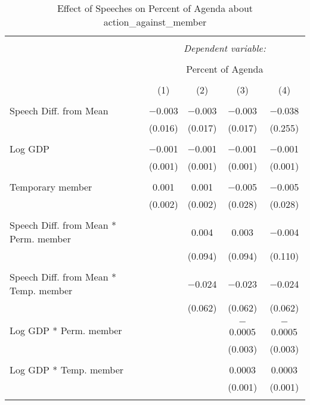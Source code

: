 
\begin{table}[!htbp] \centering 
  \caption{Effect of Speeches on Percent of Agenda about action_against_member} 
  \label{} 
\begin{tabular}{@{\extracolsep{5pt}}lcccc} 
\\[-1.8ex]\hline 
\hline \\[-1.8ex] 
 & \multicolumn{4}{c}{\textit{Dependent variable:}} \\ 
\cline{2-5} 
\\[-1.8ex] & \multicolumn{4}{c}{Percent of Agenda} \\ 
\\[-1.8ex] & (1) & (2) & (3) & (4)\\ 
\hline \\[-1.8ex] 
 Speech Diff. from Mean & $-$0.003 & $-$0.003 & $-$0.003 & $-$0.038 \\ 
  & (0.016) & (0.017) & (0.017) & (0.255) \\ 
  & & & & \\ 
 Log GDP & $-$0.001 & $-$0.001 & $-$0.001 & $-$0.001 \\ 
  & (0.001) & (0.001) & (0.001) & (0.001) \\ 
  & & & & \\ 
 Temporary member & 0.001 & 0.001 & $-$0.005 & $-$0.005 \\ 
  & (0.002) & (0.002) & (0.028) & (0.028) \\ 
  & & & & \\ 
 Speech Diff. from Mean * Perm. member &  & 0.004 & 0.003 & $-$0.004 \\ 
  &  & (0.094) & (0.094) & (0.110) \\ 
  & & & & \\ 
 Speech Diff. from Mean * Temp. member &  & $-$0.024 & $-$0.023 & $-$0.024 \\ 
  &  & (0.062) & (0.062) & (0.062) \\ 
  & & & & \\ 
 Log GDP * Perm. member &  &  & $-$0.0005 & $-$0.0005 \\ 
  &  &  & (0.003) & (0.003) \\ 
  & & & & \\ 
 Log GDP * Temp. member &  &  & 0.0003 & 0.0003 \\ 
  &  &  & (0.001) & (0.001) \\ 
  & & & & \\ 

\end{tabular}
\end{table}
